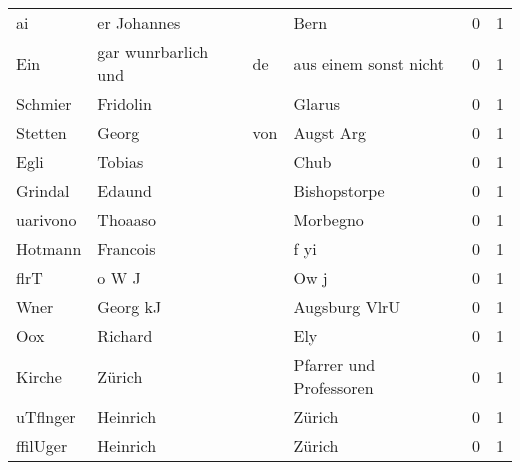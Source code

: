\begin{center}
\begin{tiny}
\begin{longtabu}{llllrr}
                       ai &                        er Johannes &             &                                        Bern &          0 &         1 \\
                      Ein &                gar wunrbarlich und &          de &                       aus einem sonst nicht &          0 &         1 \\
                  Schmier &                           Fridolin &             &                                      Glarus &          0 &         1 \\
                  Stetten &                              Georg &         von &                                   Augst Arg &          0 &         1 \\
                     Egli &                             Tobias &             &                                        Chub &          0 &         1 \\
                  Grindal &                             Edaund &             &                                Bishopstorpe &          0 &         1 \\
                 uarivono &                            Thoaaso &             &                                    Morbegno &          0 &         1 \\
                  Hotmann &                           Francois &             &                                        f yi &          0 &         1 \\
                     flrT &                              o W J &             &                                        Ow j &          0 &         1 \\
                     Wner &                           Georg kJ &             &                               Augsburg VlrU &          0 &         1 \\
                      Oox &                            Richard &             &                                         Ely &          0 &         1 \\
                   Kirche &                             Zürich &             &                     Pfarrer und Professoren &          0 &         1 \\
                 uTflnger &                           Heinrich &             &                                      Zürich &          0 &         1 \\
                 ffilUger &                           Heinrich &             &                                      Zürich &          0 &         1 \\

\end{longtabu}
\end{tiny}
\end{center}

